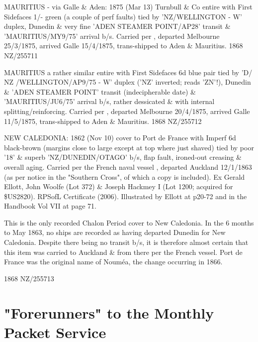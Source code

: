 \documentclass[justified]{tufte-book}
\begin{document}
%
{MAURITIUS - via Galle \& Aden: 1875 (Mar 13) Turnbull \& Co entire with First Sidefaces 1/- green (a couple of perf faults) tied by 'NZ/WELLINGTON - W' duplex, Dunedin \& very fine 'ADEN STEAMER POINT/AP28' transit \& 'MAURITIUS/MY9/75' arrival b/s. Carried per , departed Melbourne 25/3/1875, arrived Galle 15/4/1875, trans-shipped to Aden \& Mauritius.}%
{1868}%
{NZ/255711}%
{}%
{}
{}%
{}

%
{MAURITIUS a rather similar entire with First Sidefaces 6d blue pair tied by 'D/ NZ /WELLINGTON/AP9/75 - W' duplex ('NZ' inverted; reads 'ZN'!), Dunedin \& 'ADEN STEAMER POINT' transit (indecipherable date) \& 'MAURITIUS/JU6/75' arrival b/s, rather dessicated \& with internal splitting/reinforcing. Carried per , departed Melbourne 20/4/1875, arrived Galle 11/5/1875, trans-shipped to Aden \& Mauritius.}%
{1868}%
{NZ/255712}%
{}%
{}
{}%
{}

%
{NEW CALEDONIA: 1862 (Nov 10) cover to Port de France with Imperf 6d black-brown (margins close to large except at top where just shaved) tied by poor '18' \& superb 'NZ/DUNEDIN/OTAGO' b/s, flap fault, ironed-out creasing \& overall aging. Carried per the French naval vessel , departed Auckland 12/1/1863 (as per notice in the "Southern Cross", of which a copy is included). Ex Gerald Ellott, John Woolfe (Lot 372) \& Joseph Hackmey I (Lot 1200; acquired for \$US2820). RPSofL Certificate (2006). Illustrated by Ellott at p20-72 and in the Handbook Vol VII at page 71. 

This is the only recorded Chalon Period cover to New Caledonia. In the 6 months to May 1863, no ships are recorded as having departed Dunedin for New Caledonia. Despite there being no transit b/s, it is therefore almost certain that this item was carried to Auckland \& from there per the French vessel. Port de France was the original name of Nouméa, the change occurring in 1866.}%
{1868}%
{NZ/255713}%
{}%
{}
{}%
{}






\section{"Forerunners" to the Monthly Packet Service}

\end{document}

